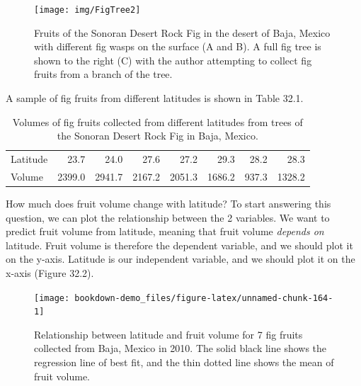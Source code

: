 \documentclass[
]{scrbook}
\begin{document}
\begin{figure}
\texttt{[image: img/FigTree2]} \caption{Fruits of the Sonoran Desert Rock Fig in the desert of Baja, Mexico with different fig wasps on the surface (A and B). A full fig tree is shown to the right (C) with the author attempting to collect fig fruits from a branch of the tree.}\label{fig:unnamed-chunk-162}
\end{figure}

A sample of fig fruits from different latitudes is shown in Table 32.1.

\begin{longtable}[]{@{}lrrrrrrr@{}}
\caption{\label{tab:unnamed-chunk-163}Volumes of fig fruits collected from different latitudes from trees of the Sonoran Desert Rock Fig in Baja, Mexico.}\tabularnewline
\toprule
\endhead
Latitude & 23.7 & 24.0 & 27.6 & 27.2 & 29.3 & 28.2 & 28.3 \\
Volume & 2399.0 & 2941.7 & 2167.2 & 2051.3 & 1686.2 & 937.3 & 1328.2 \\
\bottomrule
\end{longtable}

How much does fruit volume change with latitude?
To start answering this question, we can plot the relationship between the 2 variables.
We want to predict fruit volume from latitude, meaning that fruit volume \emph{depends on} latitude.
Fruit volume is therefore the dependent variable, and we should plot it on the y-axis.
Latitude is our independent variable, and we should plot it on the x-axis (Figure 32.2).

\begin{figure}
\texttt{[image: bookdown-demo\_files/figure-latex/unnamed-chunk-164-1]} \caption{Relationship between latitude and fruit volume for 7 fig fruits collected from Baja, Mexico in 2010. The solid black line shows the regression line of best fit, and the thin dotted line shows the mean of fruit volume.}\label{fig:unnamed-chunk-164}
\end{figure}
\end{document}
